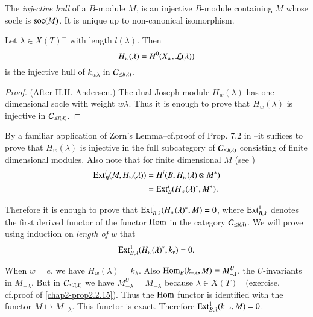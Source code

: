 \begin{definition}\label{chap3-defi3.1.9}
The {\em injective hull} 
of a $B$-module $M$, is an injective
$B$-module containing $M$ whose socle is $\operatorname{soc}(M)$. It is unique up to
non-canonical isomorphism.
\end{definition}

\begin{theorem}\label{chap3-thm3.1.10}
Let $\lambda\in X(T)^{-}$ with length $l(\lambda)$. Then
$$
H_{w}(\lambda)=H^{0}(X_{w},\mathcal{L}(\lambda))
$$
is the injective hull of $k_{w\lambda}$ in $\mathcal{C}_{\leq l(\lambda)}$. 
\end{theorem}

\begin{proof}
(After H.H. Andersen.)\pageoriginale  
The\label{page25} dual Joseph module $H_{w}(\lambda)$ has one-dimensional socle with
weight $w\lambda$. Thus it is enough to prove that $H_{w}(\lambda)$ is
injective in $\mathcal{C}_{\leq l(\lambda)}$.
\end{proof}

By a familiar application of Zorn's Lemma--cf.\@ proof of Prop. 7.2 in
\cite[Ch.\@ III]{key23}--it suffices to prove that $H_{w}(\lambda)$ is
injective in the full subcategory of $\mathcal{C}_{\leq l(\lambda)}$ consisting
of finite dimensional modules. Also note that for finite dimensional
$M$ (see \cite[I Ch.\@ 4]{key11})
\begin{align*}
\operatorname{Ext}^{i}_{B}(M,H_{w}(\lambda)) &= H^{i}(B,H_{w}(\lambda)\otimes
M^{*})\\
&= \operatorname{Ext}^{i}_{B}(H_{w}(\lambda)^{*},M^{*}).
\end{align*}

Therefore it is enough to prove that
$\operatorname{Ext}^{1}_{B,\lambda}(H_{w}(\lambda)^{*},M)=0$, where
$\operatorname{Ext}^{1}_{B,\lambda}$ denotes the first derived 
functor of the
functor $\operatorname{Hom}$ in the category $\mathcal{C}_{\leq l(\lambda)}$. We will prove
using induction on {\em length of $w$} that
$$
\operatorname{Ext}^{1}_{B,\lambda}(H_{w}(\lambda)^{*},k_{\nu})=0.
$$ 

When $w=e$, we have $H_{w}(\lambda)=k_{\lambda}$. Also
$\operatorname{Hom}_{B}(k_{-\lambda},M)=M^{U}_{-\lambda}$, the $U$-invariants in
$M_{-\lambda}$. But in $\mathcal{C}_{\leq l(\lambda)}$ we have
$M^{U}_{-\lambda}=M_{-\lambda}$ because $\lambda\in X(T)^{-}$
(exercise, cf.\@ proof of \ref{chap2-prop2.2.15}). Thus the $\operatorname{Hom}$
functor is identified with the functor $M\mapsto M_{-\lambda}$. This
functor is exact. Therefore $\operatorname{Ext}^{1}_{B,\lambda}(k_{-\lambda},M)=0$.

